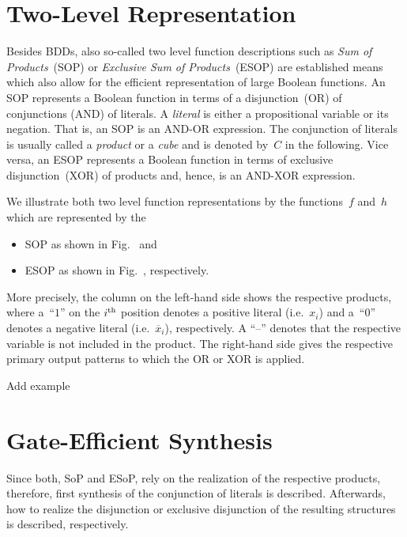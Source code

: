 \documentclass[10pt,letterpaper,twoside,openright]{book}
\begin{document}
\section{Two-Level Representation}
Besides BDDs, also so-called two level function descriptions such as
\emph{Sum of Products}~(SOP) or \emph{Exclusive Sum of Products}~(ESOP)
are established means which also allow for the efficient representation
of large Boolean functions.
An SOP represents a Boolean function in terms of 
a disjunction~(OR) of conjunctions (AND) of literals.
A \emph{literal} is either a propositional variable or its negation.
That is, an SOP is an AND-OR expression.
The conjunction of literals is usually called a \emph{product} or a \emph{cube}
and is denoted by~$C$ in the following.
Vice versa, an ESOP represents a Boolean function in terms of 
exclusive disjunction~(XOR) of products and, hence, is an AND-XOR expression.
\begin{example}
We illustrate both two level function representations by the functions~$f$ and~$h$ which are represented by the
\begin{itemize}
\item SOP as shown in Fig.~ and
\item ESOP as shown in Fig.~, respectively.
\end{itemize}
More precisely, the column on the left-hand side shows the respective products, where a~``$1$'' on
the $i^{\rm th}$ position denotes a positive literal (i.e.~$x_i$) and a~``$0$'' denotes a negative
literal (i.e.~$\overline{x}_i$), respectively.
A ``--'' denotes that the respective variable is not included in the product.
The right-hand side gives the respective primary output patterns to which the OR or XOR is applied.
\end{example}

\begin{example}
Add example
\end{example}

\section{Gate-Efficient Synthesis}
Since both, SoP and ESoP, rely on the realization of the respective products, therefore, first synthesis of the conjunction of literals is described. Afterwards, how to realize the disjunction or exclusive disjunction of the resulting structures is described, respectively.
\end{document}
